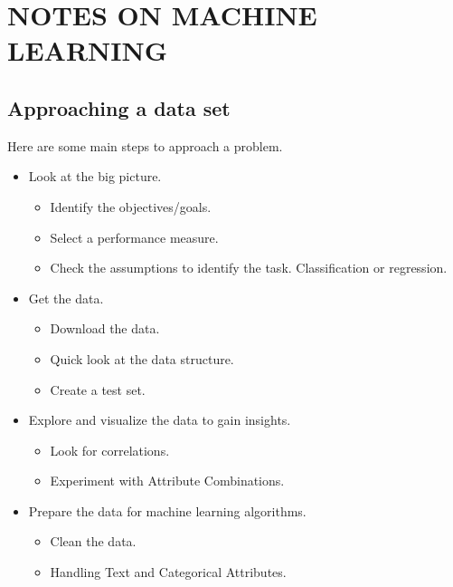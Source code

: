 \documentclass[11pt,a4paper]{article}
\numberwithin{question}{subsection}
\begin{document}
\section{NOTES ON MACHINE LEARNING}

\subsection{Approaching a data set}

Here are some main steps to approach a problem.
\begin{itemize}
	\item Look at the big picture. 
	\begin{itemize}
		\item Identify the objectives/goals.
		
		\item Select a performance measure.
		
		\item Check the assumptions to identify the task. Classification or regression.
	\end{itemize} 
	\item Get the data.
	
	\begin{itemize}
		\item Download the data.
		
			\item Quick look at the data structure.
		
		\item Create a test set.
	\end{itemize}
	
	\item Explore and visualize the data to gain insights.
	
	\begin{itemize}
	\item  Look for correlations.
	
	\item   Experiment with Attribute Combinations.
	\end{itemize}
	
	\item Prepare the data for machine learning algorithms.
	
	\begin{itemize}
		\item Clean the data.
		
		\item Handling Text and Categorical Attributes.
		

\end{itemize}
\end{itemize}
\end{document}
